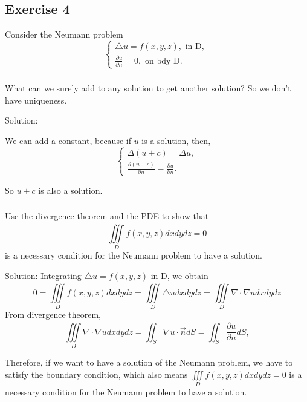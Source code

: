 \documentclass{article}
\begin{document}
		\subsection{Exercise 4}
		Consider the Neumann problem
		\begin{equation*}
			\begin{cases}
				\triangle u = f(x,y,z), \text{ in D, }
				\\
				\frac{\partial u}{\partial n}=0, \text{ on bdy D. }
			\end{cases}
		\end{equation*}
	
		\subsubsection{}
		What can we surely add to any
		solution to get another solution? So we
	don't have uniqueness.

		Solution:

		We can add a constant, because if $u$ is a solution,
		then,
		\begin{equation*}
			\begin{cases}
			\Delta(u+c)= \Delta u,
             \\
			 \frac{\partial(u+c)}{\partial n}=\frac{\partial u}{\partial n}.
			\end{cases}
		\end{equation*}
		


		So $u+c$ is also a solution.

	\subsubsection{}
	Use the divergence theorem and the PDE to show that
\[
\iiint\limits_{D}^{} f(x,y,z)dxdydz=0
\]
	is a necessary condition for the Neumann problem to have a solution.
		
		Solution: Integrating $\triangle u = f(x,y,z)$ in D, we obtain
		\[0= \iiint\limits_{D}^{} f(x,y,z)dxdydz=\iiint\limits_{D}^{} \triangle u dxdydz=\iiint\limits_{D}^{} \nabla \cdot \nabla u dxdydz
		\]
		From divergence theorem,
		\[\iiint\limits_{D}^{} \nabla \cdot \nabla u dxdydz=\iint_{S}^{} \nabla u \cdot \vec{n}dS=\iint_{S}^{} \frac{\partial u}{\partial n}dS,
			\]

			Therefore, if we want to have a solution of the Neumann problem, we have to satisfy the boundary condition, which also means $ \iiint\limits_{D}^{} f(x,y,z)dxdydz=0$ is a necessary condition for the Neumann problem to have a solution.
\end{document}
